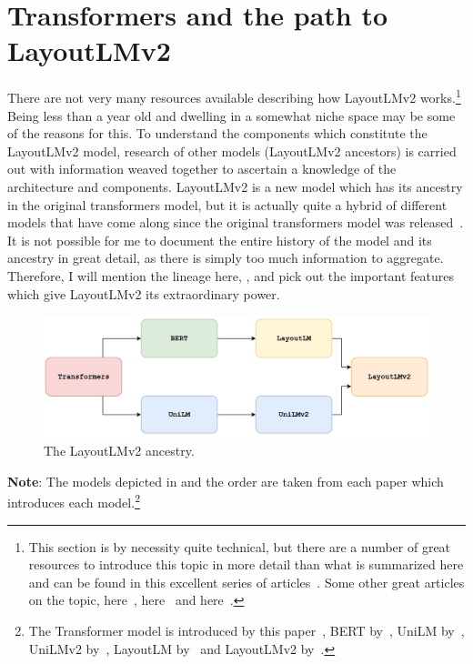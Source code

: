 \section{Transformers and the path to LayoutLMv2}
\bigbreak
There are not very many resources available describing how LayoutLMv2 works.\footnote{This section is by necessity quite technical, but there are a number of great
	resources to introduce this topic in more detail than what is summarized here and can be found in this excellent
	series of articles~\autocite{doshiTransformersExplainedVisually2021}.
	Some other great articles on the topic, here~\autocite{munozAttentionAllYou2021}, here~\autocite{cristinaTransformerModel2021}
	and here~\autocite{alammarIllustratedTransformer}.} Being less than a year old and dwelling in a somewhat niche
space may be some of the reasons for this.
To understand the components which constitute the LayoutLMv2 model, research of other models (LayoutLMv2 ancestors) is carried out
with information weaved together to ascertain a knowledge of the architecture and components.
\bigbreak
LayoutLMv2 is a new model which has its ancestry in the original transformers model, but
it is actually quite a hybrid of different models that have come along since the original transformers model was released~\autocite{vaswaniAttentionAllYou}.
It is not possible for me to document the entire history of the model and its ancestry in great detail, as there is simply too much information to
aggregate. Therefore, I will mention the lineage here, , and pick out the important features which give LayoutLMv2 its extraordinary
power.
\bigbreak
\begin{figure}[H]
	\centering
	\includegraphics[width=1\textwidth]{figures/layoutlmv2_ancestry.png}
	\caption{The LayoutLMv2 ancestry.}
	\label{fig:layoutlmv2_ancestry}
\end{figure}
\textbf{Note}: The models depicted in  and the order are taken from each paper which introduces
each model.\footnote{The Transformer model is introduced by this paper~\autocite{vaswaniAttentionAllYou},
	BERT by~\autocite{devlinBERTPretrainingDeep2019}, UniLM by~\autocite{dongUnifiedLanguageModel2019},
	UniLMv2 by~\autocite{baoUniLMv2PseudoMaskedLanguage2020}, LayoutLM by~\autocite{xuLayoutLMPretrainingText2020} and
	LayoutLMv2 by~\autocite{xuLayoutLMv2MultimodalPretraining2022}.}
